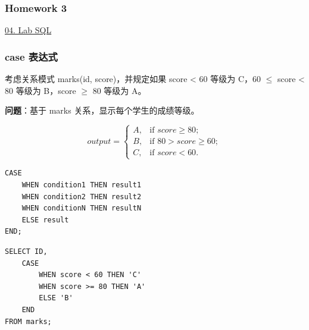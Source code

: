 \documentclass[aspectratio=169, 14pt]{beamer}
\begin{document}
\begin{frame}
    \frametitle{Homework 3}

    \href{https://github.com/ChenZhongPu/db-swufe/tree/master/04_lab_sql}{04. Lab SQL}

\end{frame}

\begin{frame}
    \frametitle{case 表达式}

    考虑关系模式 marks(id, score)，并规定如果 score < 60 等级为 C，60 $\leq$ score < 80 等级为 B，score $\geq$ 80 等级为 A。

    {\large {}} \textbf{问题}：基于 marks 关系，显示每个学生的成绩等级。
    
\[
output = \begin{cases}
    A, & \text{if $score \geq 80$}; \\
    B, & \text{if $80 > score \geq 60$}; \\
    C, & \text{if $score < 60$}.
\end{cases}
\]
\end{frame}
\begin{frame}[fragile]
    \begin{verbatim}
CASE
    WHEN condition1 THEN result1
    WHEN condition2 THEN result2
    WHEN conditionN THEN resultN
    ELSE result
END;
    \end{verbatim}

    \begin{verbatim}
SELECT ID,
    CASE
        WHEN score < 60 THEN 'C'
        WHEN score >= 80 THEN 'A'
        ELSE 'B'
    END
FROM marks;
    \end{verbatim}

\end{frame}
\end{document}

